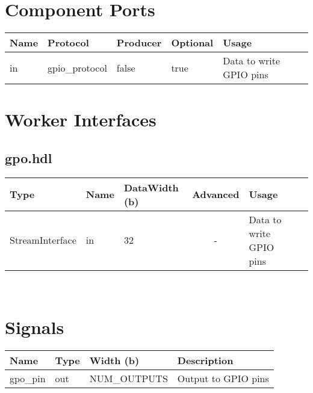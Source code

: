 \documentclass{article}
\begin{document}
\begin{landscape}
\begin{flushleft}
\end{flushleft}

 
\section*{Component Ports}

        \begin{scriptsize}
                \begin{tabular}{|M{2.5cm}|M{2cm}|M{2cm}|M{3cm}|M{11cm}|}
                        \hline
                        Name & Protocol & Producer & Optional & Usage\\
                        \hline
                        in
                        & gpio\_protocol
                        & false
                        & true
                        & Data to write GPIO pins \\
                        \hline
                \end{tabular}
			\end{scriptsize}
			
\section*{Worker Interfaces}
\subsection*{gpo.hdl}
\begin{scriptsize}
\begin{tabular}{|M{5cm}|M{4cm}|M{4cm}|c|M{6.5cm}|M{6cm}|}
            \hline
            Type    & Name & DataWidth (b) & Advanced  & Usage     \\
            \hline
            StreamInterface & in   & 32  & - & Data to write GPIO pins \\
           \hline

\end{tabular}
\end{scriptsize} \\

	
\section*{Signals}
	\begin{scriptsize}
		\begin{tabular}{|M{2.5cm}|M{3cm}|M{6.5cm}|M{9.2cm}|}
			\hline
			Name         & Type   & Width (b) & Description                       \\
			\hline
			gpo\_pin    & out & NUM\_OUTPUTS & Output to GPIO pins            \\
			\hline
		\end{tabular}
	\end{scriptsize}
\end{landscape}
\end{document}
